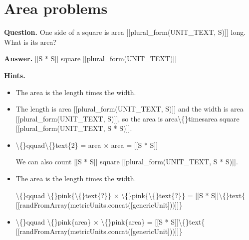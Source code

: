 \documentclass{article}
\begin{document}
\section*{Area problems}
\textbf{Question.} One side of a square is area
                [[plural\_form(UNIT\_TEXT, S)]] long. What is its area?

\textbf{Answer.} [[S * S]] square
                [[plural\_form(UNIT\_TEXT)]]

\textbf{Hints.}
\begin{itemize}
  \item The area is the length times the width.
  \item The length is area [[plural\_form(UNIT\_TEXT, S)]] and
                        the width is area [[plural\_form(UNIT\_TEXT, S)]], so the
                        area is area\textbackslash\{\}timesarea
                        square [[plural\_form(UNIT\_TEXT, S * S)]].
  \item \textbackslash\{\}qquad\textbackslash\{\}text\{2\} = area $\times$ area
                        = [[S * S]]
                    
                    
                        We can also count [[S * S]]
                        square [[plural\_form(UNIT\_TEXT, S * S)]].
  \item The area is the length times the width.
                    
                    \textbackslash\{\}qquad \textbackslash\{\}pink\{\textbackslash\{\}text\{?\}\} $\times$ \textbackslash\{\}pink\{\textbackslash\{\}text\{?\}\} =
                        [[S * S]]\textbackslash\{\}text\{ [[randFromArray(metricUnits.concat([genericUnit]))]]\}
  \item \textbackslash\{\}qquad \textbackslash\{\}pink\{area\} $\times$
                        \textbackslash\{\}pink\{area\} =
                        [[S * S]]\textbackslash\{\}text\{ [[randFromArray(metricUnits.concat([genericUnit]))]]\}
                    

\end{itemize}
\end{document}
